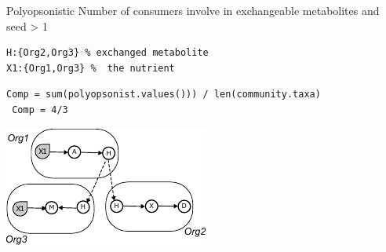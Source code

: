 \documentclass[8pt,usenames,dvipsnames]{beamer}
\begin{document}
\begin{frame}[fragile]
\begin{onlyenv}
\begin{minipage}{0.5\textwidth}

\begin{exampleblock}{Polyopsonistic}
Number of consumers involve in exchangeable metabolites and seed > 1
\end{exampleblock}{}

\begin{lstlisting}[mathescape=True]
H:{Org2,Org3} % exchanged metabolite
X1:{Org1,Org3} %  the nutrient
\end{lstlisting}

\begin{lstlisting}[mathescape=True]
 Comp = sum(polyopsonist.values())) / len(community.taxa)
 Comp = 4/3 
\end{lstlisting}

%

\end{minipage}%
\hspace{0.5cm}
\hfill
\begin{minipage}{0.4\textwidth}
\includegraphics[width=\textwidth]{figures/exchanged.pdf}
\end{minipage}
\end{onlyenv}


\end{frame}
\end{document}
